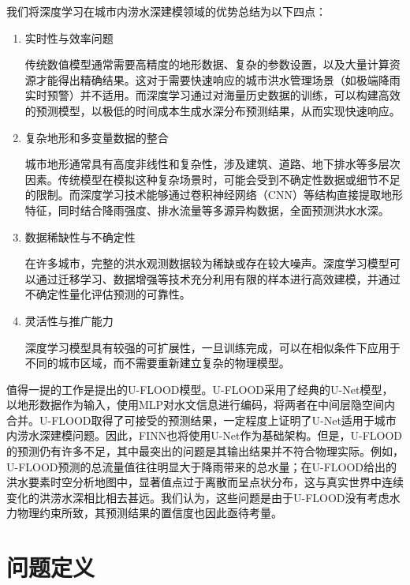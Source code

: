 \documentclass[12pt, a4paper]{article}
\begin{document}
我们将深度学习在城市内涝水深建模领域的优势总结为以下四点：

\begin{enumerate}

    \item 实时性与效率问题

    \par 传统数值模型通常需要高精度的地形数据、复杂的参数设置，以及大量计算资源才能得出精确结果。这对于需要快速响应的城市洪水管理场景（如极端降雨实时预警）并不适用。而深度学习通过对海量历史数据的训练，可以构建高效的预测模型，以极低的时间成本生成水深分布预测结果，从而实现快速响应。

    \item 复杂地形和多变量数据的整合

    \par 城市地形通常具有高度非线性和复杂性，涉及建筑、道路、地下排水等多层次因素。传统模型在模拟这种复杂场景时，可能会受到不确定性数据或细节不足的限制。而深度学习技术能够通过卷积神经网络（CNN）等结构直接提取地形特征，同时结合降雨强度、排水流量等多源异构数据，全面预测洪水水深。

    \item 数据稀缺性与不确定性

    \par 在许多城市，完整的洪水观测数据较为稀缺或存在较大噪声。深度学习模型可以通过迁移学习、数据增强等技术充分利用有限的样本进行高效建模，并通过不确定性量化评估预测的可靠性。

    \item 灵活性与推广能力

    \par 深度学习模型具有较强的可扩展性，一旦训练完成，可以在相似条件下应用于不同的城市区域，而不需要重新建立复杂的物理模型。
    
\end{enumerate}

值得一提的工作是\cite{lowe2021u}提出的U-FLOOD模型。U-FLOOD采用了经典的U-Net模型，以地形数据作为输入，使用MLP对水文信息进行编码，将两者在中间层隐空间内合并。U-FLOOD取得了可接受的预测结果，一定程度上证明了U-Net适用于城市内涝水深建模问题。因此，FINN也将使用U-Net作为基础架构。但是，U-FLOOD的预测仍有许多不足，其中最突出的问题是其输出结果并不符合物理实际。例如，U-FLOOD预测的总流量值往往明显大于降雨带来的总水量；在U-FLOOD给出的洪水要素时空分析地图中，显著值点过于离散而呈点状分布，这与真实世界中连续变化的洪涝水深相比相去甚远。我们认为，这些问题是由于U-FLOOD没有考虑水力物理约束所致，其预测结果的置信度也因此亟待考量。

\section{问题定义}
\end{document}
